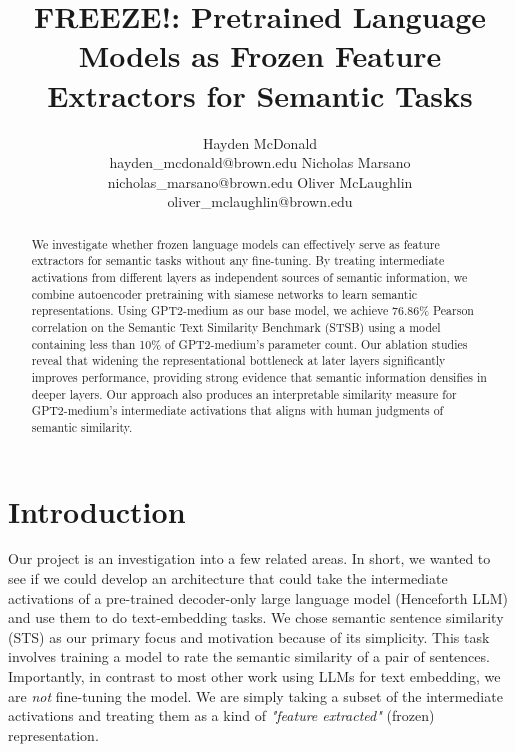 \documentclass{article}
\title{FREEZE!: Pretrained Language Models as Frozen Feature Extractors for Semantic Tasks}
\author{
    Hayden McDonald\\hayden\_mcdonald@brown.edu \And
    Nicholas Marsano\\nicholas\_marsano@brown.edu\And
    Oliver McLaughlin\\oliver\_mclaughlin@brown.edu
}
\begin{document}
\maketitle

\begin{abstract}
    We investigate whether frozen language models can effectively serve as feature extractors for semantic tasks without any fine-tuning. By treating intermediate activations from different layers as independent sources of semantic information, we combine autoencoder pretraining with siamese networks to learn semantic representations. Using GPT2-medium as our base model, we achieve 76.86\% Pearson correlation on the Semantic Text Similarity Benchmark (STSB) using a model containing less than 10\% of GPT2-medium's parameter count. Our ablation studies reveal that widening the representational bottleneck at later layers significantly improves performance, providing strong evidence that semantic information densifies in deeper layers. Our approach also produces an interpretable similarity measure for GPT2-medium's intermediate activations that aligns with human judgments of semantic similarity.
\end{abstract}

\section{Introduction}
Our project is an investigation into a few related areas. In short, we wanted to see if we could develop an architecture that could take the intermediate activations of a pre-trained decoder-only large language model (Henceforth LLM) and use them to do text-embedding tasks. We chose semantic sentence similarity (STS) as our primary focus and motivation because of its simplicity. This task involves training a model to rate the semantic similarity of a pair of sentences. Importantly, in contrast to most other work using LLMs for text embedding, we are \textit{not} fine-tuning the model. We are simply taking a subset of the intermediate activations and treating them as a kind of \textit{"feature extracted"} (frozen) representation.
\end{document}
